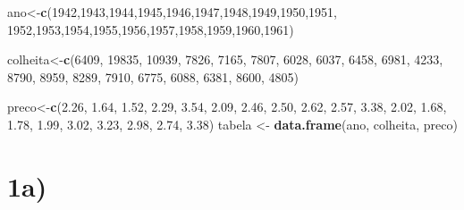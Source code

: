 \documentclass[11pt,]{article}
\newenvironment{Shaded}{\begin{snugshade}}{\end{snugshade}}
\newcommand{\KeywordTok}[1]{\textcolor[rgb]{0.13,0.29,0.53}{\textbf{{#1}}}}
\newcommand{\DecValTok}[1]{\textcolor[rgb]{0.00,0.00,0.81}{{#1}}}
\newcommand{\FloatTok}[1]{\textcolor[rgb]{0.00,0.00,0.81}{{#1}}}
\newcommand{\StringTok}[1]{\textcolor[rgb]{0.31,0.60,0.02}{{#1}}}
\newcommand{\NormalTok}[1]{{#1}}
\begin{document}
\begin{Shaded}
\begin{Highlighting}[]
\NormalTok{ano<-}\KeywordTok{c}\NormalTok{(}\DecValTok{1942}\NormalTok{,}\DecValTok{1943}\NormalTok{,}\DecValTok{1944}\NormalTok{,}\DecValTok{1945}\NormalTok{,}\DecValTok{1946}\NormalTok{,}\DecValTok{1947}\NormalTok{,}\DecValTok{1948}\NormalTok{,}\DecValTok{1949}\NormalTok{,}\DecValTok{1950}\NormalTok{,}\DecValTok{1951}\NormalTok{,}
       \DecValTok{1952}\NormalTok{,}\DecValTok{1953}\NormalTok{,}\DecValTok{1954}\NormalTok{,}\DecValTok{1955}\NormalTok{,}\DecValTok{1956}\NormalTok{,}\DecValTok{1957}\NormalTok{,}\DecValTok{1958}\NormalTok{,}\DecValTok{1959}\NormalTok{,}\DecValTok{1960}\NormalTok{,}\DecValTok{1961}\NormalTok{)}

\NormalTok{colheita<-}\KeywordTok{c}\NormalTok{(}\DecValTok{6409}\NormalTok{, }\DecValTok{19835}\NormalTok{, }\DecValTok{10939}\NormalTok{, }\DecValTok{7826}\NormalTok{, }\DecValTok{7165}\NormalTok{, }\DecValTok{7807}\NormalTok{, }\DecValTok{6028}\NormalTok{, }\DecValTok{6037}\NormalTok{, }\DecValTok{6458}\NormalTok{, }\DecValTok{6981}\NormalTok{,}
            \DecValTok{4233}\NormalTok{, }\DecValTok{8790}\NormalTok{, }\DecValTok{8959}\NormalTok{, }\DecValTok{8289}\NormalTok{, }\DecValTok{7910}\NormalTok{, }\DecValTok{6775}\NormalTok{, }\DecValTok{6088}\NormalTok{, }\DecValTok{6381}\NormalTok{, }\DecValTok{8600}\NormalTok{, }\DecValTok{4805}\NormalTok{)}

\NormalTok{preco<-}\KeywordTok{c}\NormalTok{(}\FloatTok{2.26}\NormalTok{, }\FloatTok{1.64}\NormalTok{, }\FloatTok{1.52}\NormalTok{, }\FloatTok{2.29}\NormalTok{, }\FloatTok{3.54}\NormalTok{, }\FloatTok{2.09}\NormalTok{, }\FloatTok{2.46}\NormalTok{, }\FloatTok{2.50}\NormalTok{, }\FloatTok{2.62}\NormalTok{, }\FloatTok{2.57}\NormalTok{,}
         \FloatTok{3.38}\NormalTok{, }\FloatTok{2.02}\NormalTok{, }\FloatTok{1.68}\NormalTok{, }\FloatTok{1.78}\NormalTok{, }\FloatTok{1.99}\NormalTok{, }\FloatTok{3.02}\NormalTok{, }\FloatTok{3.23}\NormalTok{, }\FloatTok{2.98}\NormalTok{, }\FloatTok{2.74}\NormalTok{, }\FloatTok{3.38}\NormalTok{)}
\NormalTok{tabela <-}\StringTok{ }\KeywordTok{data.frame}\NormalTok{(ano, colheita, preco)}
\end{Highlighting}
\end{Shaded}

\section{1a)}\label{a}
\end{document}
